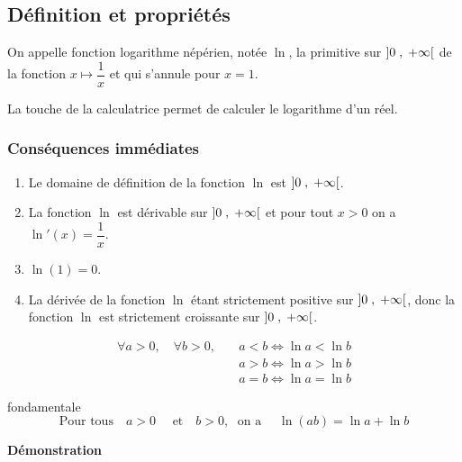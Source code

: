 
\everymath{\displaystyle}


\subsection{Définition et propriétés}


\begin{definition}
On appelle fonction logarithme népérien,  notée $ \ln $, la primitive   sur $ \left]0 \;,\; +\infty\right[ $ de la  fonction  $ x  \longmapsto \dfrac{1}{x} $  et qui s'annule pour  $ x=1 $.

\end{definition}


La touche \fbox{ $ \ln $} de la calculatrice permet de calculer le logarithme d'un réel.
 
 \subsubsection*{Conséquences immédiates}
\begin{enumerate}
\item Le domaine de définition de la fonction $ \ln $  est  $ \left]0 \;,\; +\infty\right[ $.
\item La fonction $ \ln $  est  dérivable  sur  $ \left]0 \;,\; +\infty\right[ $  et pour tout $ x> 0 $ on a   $\ln'(x)=\dfrac{1}{x} $.
\item  $\ln (1)= 0$.
\item  La dérivée de la fonction $ \ln $ étant strictement positive  sur $ \left]0 \;,\; +\infty\right[ $, donc la  fonction $ \ln $  est strictement croissante sur  $ \left]0 \;,\; +\infty\right[ $.
\end{enumerate}

\begin{property}

\begin{align*}
    \forall a > 0, \quad  \forall b > 0 ,\quad & a< b \Longleftrightarrow \ln a < \ln b \\
    & a> b \Longleftrightarrow \ln a  >\ln b  \\
    & a= b \Longleftrightarrow \ln a  =\ln b
    \end{align*} 
   \end{property}

 \begin{property}{fondamentale}
$$\text{Pour tous}\quad  a> 0 \quad  \text{ et} \quad  b>0 ,\;\text{ on a }\quad  \ln(ab)=\ln a +\ln b $$
 \end{property}
\textbf{Démonstration}

